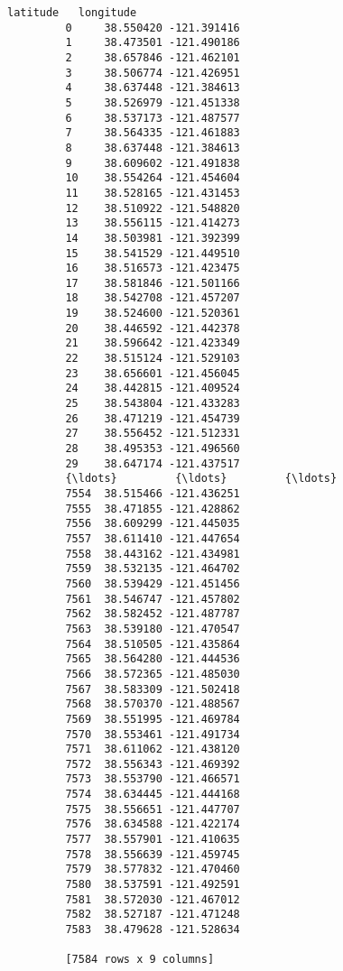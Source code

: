 \documentclass[11pt]{article}
\begin{document}
\begin{Verbatim}[commandchars=\\\{\}]
                latitude   longitude  
         0     38.550420 -121.391416  
         1     38.473501 -121.490186  
         2     38.657846 -121.462101  
         3     38.506774 -121.426951  
         4     38.637448 -121.384613  
         5     38.526979 -121.451338  
         6     38.537173 -121.487577  
         7     38.564335 -121.461883  
         8     38.637448 -121.384613  
         9     38.609602 -121.491838  
         10    38.554264 -121.454604  
         11    38.528165 -121.431453  
         12    38.510922 -121.548820  
         13    38.556115 -121.414273  
         14    38.503981 -121.392399  
         15    38.541529 -121.449510  
         16    38.516573 -121.423475  
         17    38.581846 -121.501166  
         18    38.542708 -121.457207  
         19    38.524600 -121.520361  
         20    38.446592 -121.442378  
         21    38.596642 -121.423349  
         22    38.515124 -121.529103  
         23    38.656601 -121.456045  
         24    38.442815 -121.409524  
         25    38.543804 -121.433283  
         26    38.471219 -121.454739  
         27    38.556452 -121.512331  
         28    38.495353 -121.496560  
         29    38.647174 -121.437517  
         {\ldots}         {\ldots}         {\ldots}  
         7554  38.515466 -121.436251  
         7555  38.471855 -121.428862  
         7556  38.609299 -121.445035  
         7557  38.611410 -121.447654  
         7558  38.443162 -121.434981  
         7559  38.532135 -121.464702  
         7560  38.539429 -121.451456  
         7561  38.546747 -121.457802  
         7562  38.582452 -121.487787  
         7563  38.539180 -121.470547  
         7564  38.510505 -121.435864  
         7565  38.564280 -121.444536  
         7566  38.572365 -121.485030  
         7567  38.583309 -121.502418  
         7568  38.570370 -121.488567  
         7569  38.551995 -121.469784  
         7570  38.553461 -121.491734  
         7571  38.611062 -121.438120  
         7572  38.556343 -121.469392  
         7573  38.553790 -121.466571  
         7574  38.634445 -121.444168  
         7575  38.556651 -121.447707  
         7576  38.634588 -121.422174  
         7577  38.557901 -121.410635  
         7578  38.556639 -121.459745  
         7579  38.577832 -121.470460  
         7580  38.537591 -121.492591  
         7581  38.572030 -121.467012  
         7582  38.527187 -121.471248  
         7583  38.479628 -121.528634  
         
         [7584 rows x 9 columns]
\end{Verbatim}
            
\end{document}
